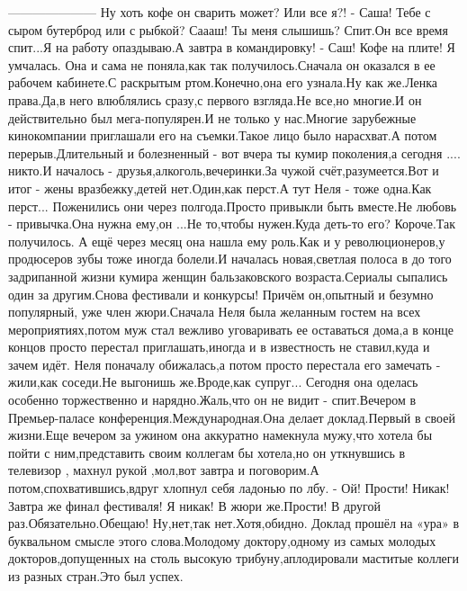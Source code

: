 ———————
Ну хоть кофе он сварить может? Или все я?! 
- Саша! Тебе с сыром бутерброд или с рыбкой? Саааш! Ты меня слышишь? 
Спит.Он все время спит...Я на работу опаздываю.А завтра в командировку! 
- Саш! Кофе на плите! Я умчалась.
Она и сама не поняла,как так получилось.Сначала он оказался в ее рабочем кабинете.С раскрытым ртом.Конечно,она его узнала.Ну как же.Ленка права.Да,в него влюблялись сразу,с первого взгляда.Не все,но многие.И он действительно был мега-популярен.И не только у нас.Многие зарубежные кинокомпании приглашали его на съемки.Такое лицо было нарасхват.А потом перерыв.Длительный и болезненный - вот вчера ты кумир поколения,а сегодня .... никто.И началось - друзья,алкоголь,вечеринки.За чужой счёт,разумеется.Вот и итог - жены вразбежку,детей нет.Один,как перст.А тут Неля - тоже одна.Как перст...
Поженились они через полгода.Просто привыкли быть вместе.Не любовь - привычка.Она нужна ему,он ...Не то,чтобы нужен.Куда деть-то его? Короче.Так получилось.
А ещё через месяц она нашла ему роль.Как и у революционеров,у продюсеров зубы тоже иногда болели.И началась новая,светлая полоса в до того задрипанной жизни кумира женщин бальзаковского возраста.Сериалы сыпались один за другим.Снова фестивали и конкурсы! Причём он,опытный и безумно популярный, уже член жюри.Сначала Неля была желанным гостем на всех мероприятиях,потом муж стал вежливо уговаривать ее оставаться дома,а в конце концов просто перестал приглашать,иногда и в известность не ставил,куда и зачем идёт.
 Неля поначалу обижалась,а потом просто перестала его замечать - жили,как соседи.Не выгонишь же.Вроде,как супруг...
Сегодня она оделась особенно торжественно и нарядно.Жаль,что он не видит - спит.Вечером в Премьер-паласе конференция.Международная.Она делает доклад.Первый в своей жизни.Еще вечером за ужином она аккуратно намекнула мужу,что хотела бы пойти с ним,представить своим коллегам бы хотела,но он уткнувшись в телевизор , махнул рукой ,мол,вот завтра и поговорим.А потом,спохватившись,вдруг хлопнул себя ладонью по лбу. 
 - Ой! Прости! Никак! Завтра же финал фестиваля! Я никак! В жюри же.Прости! В другой раз.Обязательно.Обещаю! 
Ну,нет,так нет.Хотя,обидно.
Доклад прошёл на «ура» в буквальном смысле этого слова.Молодому доктору,одному из самых молодых докторов,допущенных на столь высокую трибуну,аплодировали маститые коллеги из разных стран.Это был успех.
